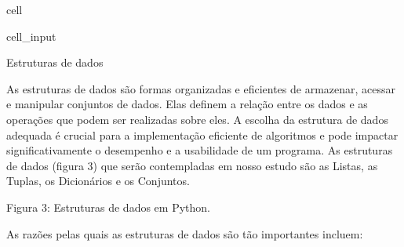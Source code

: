\documentclass[letterpaper,10pt,english]{jupyterBook}
\begin{document}
\begin{sphinxuseclass}{cell}\begin{sphinxVerbatimInput}

\begin{sphinxuseclass}{cell_input}
\begin{sphinxVerbatim}[commandchars=\\\{\}]
\end{sphinxVerbatim}

\end{sphinxuseclass}\end{sphinxVerbatimInput}

\end{sphinxuseclass}
 Estruturas de dados

\sphinxAtStartPar
As estruturas de dados são formas organizadas e eficientes de armazenar, acessar e manipular conjuntos de dados. Elas definem a relação entre os dados e as operações que podem ser realizadas sobre eles. A escolha da estrutura de dados adequada é crucial para a implementação eficiente de algoritmos e pode impactar significativamente o desempenho e a usabilidade de um programa. As estruturas de dados (figura 3) que serão contempladas em nosso estudo são as Listas, as Tuplas, os Dicionários e os Conjuntos.

\sphinxAtStartPar
Figura 3: Estruturas de dados em Python.

\sphinxAtStartPar
As razões pelas quais as estruturas de dados são tão importantes incluem:
\end{document}
